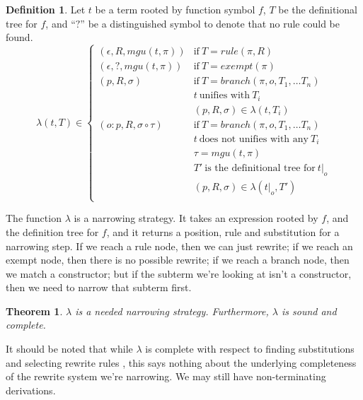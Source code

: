 \documentclass{book}
\newtheorem{theorem}{Theorem}
\theoremstyle{definition}
\newtheorem{definition}{Definition}[section]
\begin{document}
\theoremstyle{definition}
\begin{definition}
    Let $t$ be a term rooted by function symbol $f$,
    $T$ be the definitional tree for $f$,
    and ``$?$'' be a distinguished symbol to denote that no rule could be found.
    $$\lambda(t,T) \in  
    \begin{cases}
        (\epsilon, R, mgu(t, \pi))   & \text{if}\ T = rule(\pi, R) \\
        (\epsilon, ?, mgu(t, \pi))   & \text{if}\ T = exempt(\pi) \\
        (p, R, \sigma)               & \text{if}\ T = branch(\pi, o, T_1, \ldots T_n) \\
                                     & t\ \text{unifies with}\ T_i \\
                                     & (p, R, \sigma) \in \lambda(t, T_i) \\
        (o:p, R, \sigma \circ \tau)  & \text{if}\ T = branch(\pi, o, T_1, \ldots T_n) \\
                                     & t\ \text{does not unifies with any}\ T_i \\
                                     & \tau = mgu(t, \pi) \\
                                     & T'\ \text{is the definitional tree for}\ t\vert_o \\
                                     & (p, R, \sigma) \in \lambda(t\vert_o, T') \\
    \end{cases}
    $$
\end{definition}

The function $\lambda$ is a narrowing strategy.
It takes an expression rooted by $f$, and the definition tree for $f$,
and it returns a position, rule and substitution for a narrowing step.
If we reach a rule node, then we can just rewrite;
if we reach an exempt node, then there is no possible rewrite;
if we reach a branch node, then we match a constructor;
but if the subterm we're looking at isn't a constructor, then we need to narrow that subterm first.


\begin{theorem}
    $\lambda$ is a needed narrowing strategy.
    Furthermore, $\lambda$ is sound and complete.
\end{theorem}

It should be noted that while $\lambda$ is complete with respect to finding substitutions
and selecting rewrite rules \cite{Needed},
this says nothing about the underlying completeness of the rewrite system we're narrowing.
We may still have non-terminating derivations.
\end{document}
